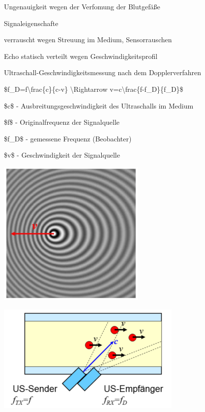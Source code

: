 \documentclass[a4paper]{article}
\begin{document}
\begin{multicols}{3}
\begin{itemize*}
\begin{itemize*}
\begin{itemize*}
        \item Ungenauigkeit wegen der Verfomung der Blutgefäße
      \end{itemize*}
      \item Signaleigenschafte
      \begin{itemize*}
        \item verrauscht wegen Streuung im Medium, Sensorrauschen
        \item Echo statisch verteilt wegen Geschwindigkeitsprofil
      \end{itemize*}
    \end{itemize*}
    \item Ultraschall-Geschwindigkeitsmessung nach dem Dopplerverfahren
    \begin{itemize*}
      \item \$f\_D=f\textbackslash frac\{c\}\{c-v\} \textbackslash Rightarrow v=c\textbackslash frac\{f-f\_D\}\{f\_D\}\$
      \item \$c\$ - Ausbreitungsgeschwindigkeit des Ultraschalls im Medium
      \item \$f\$ - Originalfrequenz der Signalquelle
      \item \$f\_D\$ - gemessene Frequenz (Beobachter)
      \item \$v\$ - Geschwindigkeit der Signalquelle
      \item \includegraphics[width=.5\linewidth]{Assets/Biosignalverarbeitung-ultraschall-doppler.png}
      \item \includegraphics[width=.5\linewidth]{Assets/Biosignalverarbeitung-ultraschall-doppler-2.png}

\end{itemize*}
\end{itemize*}
\end{multicols}
\end{document}
